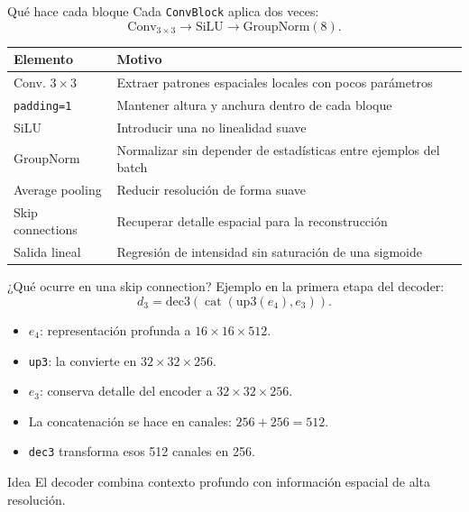 \documentclass[10pt,aspectratio=169]{beamer}
\begin{document}
\begin{frame}{Qué hace cada bloque}
  Cada \texttt{ConvBlock} aplica dos veces:
  \[
    \mathrm{Conv}_{3\times3}\rightarrow\mathrm{SiLU}\rightarrow\mathrm{GroupNorm}(8).
  \]

  \begin{tabular}{p{3.6cm}p{7.6cm}}
    \toprule
    Elemento & Motivo \\
    \midrule
    Conv. $3\times3$ & Extraer patrones espaciales locales con pocos parámetros \\
    \texttt{padding=1} & Mantener altura y anchura dentro de cada bloque \\
    SiLU & Introducir una no linealidad suave \\
    GroupNorm & Normalizar sin depender de estadísticas entre ejemplos del batch \\
    Average pooling & Reducir resolución de forma suave \\
    Skip connections & Recuperar detalle espacial para la reconstrucción \\
    Salida lineal & Regresión de intensidad sin saturación de una sigmoide \\
    \bottomrule
  \end{tabular}
\end{frame}

\begin{frame}{¿Qué ocurre en una skip connection?}
  Ejemplo en la primera etapa del decoder:
  \[
    d_3=\mathrm{dec3}\left(
      \operatorname{cat}(\mathrm{up3}(e_4),e_3)
    \right).
  \]

  \begin{itemize}
    \item $e_4$: representación profunda a $16\times16\times512$.
    \item \texttt{up3}: la convierte en $32\times32\times256$.
    \item $e_3$: conserva detalle del encoder a $32\times32\times256$.
    \item La concatenación se hace en canales: $256+256=512$.
    \item \texttt{dec3} transforma esos 512 canales en 256.
  \end{itemize}

  \begin{block}{Idea}
    El decoder combina contexto profundo con información espacial de alta resolución.
  \end{block}
\end{frame}
\end{document}

